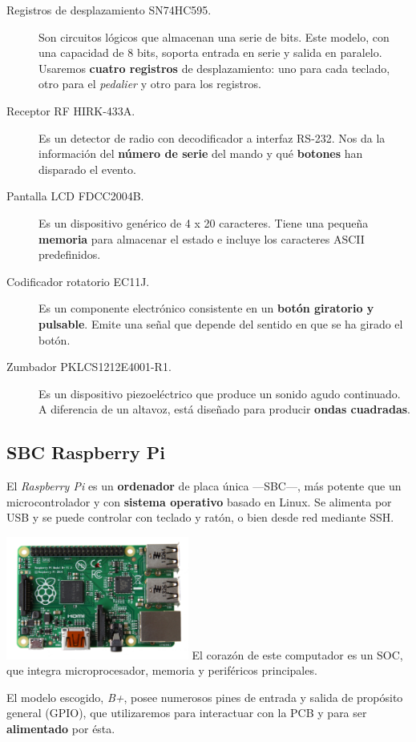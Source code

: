 \documentclass[10pt,a4paper]{article}
\begin{document}
	\begin{description}
		\item[Registros de desplazamiento SN74HC595.] Son circuitos lógicos que almacenan una serie de bits. Este modelo, con una capacidad de 8 bits, soporta entrada en serie y salida en paralelo. Usaremos \textbf{cuatro registros} de desplazamiento: uno para cada teclado, otro para el \textit{pedalier} y otro para los registros.
		
		\item[Receptor RF HIRK-433A.] Es un detector de radio con decodificador a interfaz RS-232. Nos da la información del \textbf{número de serie} del mando y qué \textbf{botones} han disparado el evento. 
		
		\item[Pantalla LCD FDCC2004B.] Es un dispositivo genérico de 4 x 20 caracteres. Tiene una pequeña \textbf{memoria} para almacenar el estado e incluye los caracteres ASCII predefinidos.
		
		\item[Codificador rotatorio EC11J.] Es un componente electrónico consistente en un \textbf{botón giratorio y pulsable}. Emite una señal que depende del sentido en que se ha girado el botón.
		
		\item[Zumbador PKLCS1212E4001-R1.] Es un dispositivo piezoeléctrico que produce un sonido agudo continuado. A diferencia de un altavoz, está diseñado para producir \textbf{ondas cuadradas}.
	\end{description}
	
	\subsection{SBC Raspberry Pi}
	
	El \textit{Raspberry Pi} es un \textbf{ordenador} de placa única ---SBC---, más potente que un microcontrolador y con \textbf{sistema operativo} basado en Linux. Se alimenta por USB y se puede controlar con teclado y ratón, o bien desde red mediante SSH.
	
	\begin{multicols}{2}
		\noindent
		\includegraphics[width=0.45\textwidth]{images/raspberry} 
		\columnbreak
		El corazón de este computador es un SOC, que integra microprocesador, memoria y periféricos principales.
		
		El modelo escogido, \textit{B+}, posee numerosos pines de entrada y salida de propósito general (GPIO), que utilizaremos para interactuar con la PCB y para ser \textbf{alimentado} por ésta.
	\end{multicols}
	
\end{document}
